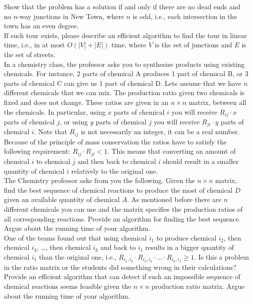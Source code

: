 \documentclass{article}
\begin{document}
 Show that the problem has a solution if and only if
there are no dead ends and no $n$-way junctions in New Town, where $n$
is odd, i.e., each intersection in the town has an even degree.\\

 If such tour exists, please describe an efficient
algorithm to find the tour in linear time, i.e., in at most $O(|V| +
|E|)$ time, where $V$ is the set of junctions and $E$ is the set of
streets.\\

 In a chemistry class, the
professor asks you to synthesize products using existing
chemicals. For instance, 2 parts of chemical A produces 1 part of
chemical B, or 3 parts of chemical C can give us 1 part of chemical
D. Lets assume that we have $n$ different chemicals that we can
mix. The production ratio given two chemicals is fixed and does not
change. These ratios are given in an $n \times n$ matrix, between all
the chemicals. In particular, using $x$ parts of chemical $i$ you will
receive $R_{ij} \cdot x$ parts of chemical $j$, or using $y$ parts of
chemical $j$ you will receive $R_{ji} \cdot y$ parts of chemical
$i$. Note that $R_{ij}$ is not necessarily an integer, it can be a
real number.\\

\noindent Because of the principle of mass conservation the ratios
have to satisfy the following requirement: $R_{ij} \cdot R_{ji} <
1$. This means that converting an amount of chemical $i$ to chemical
$j$ and then back to chemical $i$ should result in a smaller quantity
of chemical $i$ relatively to the original one.\\

 The Chemistry professor asks from you the
following. Given the $n \times n$ matrix, find the best sequence of
chemical reactions to produce the most of chemical $D$ given an
available quantity of chemical $A$. As mentioned before there are $n$
different chemicals you can use and the matrix specifies the
production ratios of all corresponding reactions. Provide an algorithm
for finding the best sequence. Argue about the running time of your
algorithm.\\

 One of the teams found out that using chemical
$i_1$ to produce chemical $i_2$, then chemical $i_3$, \dots, then
chemical $i_k$ and back to $i_1$ results in a bigger quantity of
chemical $i_1$ than the original one, i.e., $R_{i_1,i_2} \cdot
R_{i_2,i_3} \cdot \ldots \cdot R_{i_k,i_1} \geq 1$. Is this a problem
in the ratio matrix or the students did something wrong in their
calculations? Provide an efficient algorithm that can detect if such
an impossible sequence of chemical reactions seems feasible given the
$n \times n$ production ratio matrix. Argue about the running time of
your algorithm.\\
\end{document}
